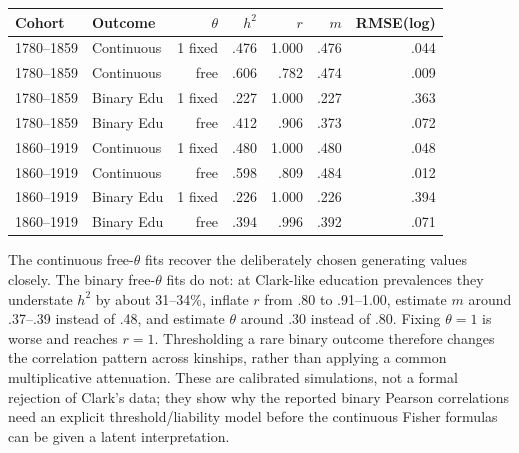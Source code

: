 \begin{center}
\small
\begin{tabular}{llrrrrr}
\hline
Cohort & Outcome & $\theta$ & $h^2$ & $r$ & $m$ & RMSE(log)\\
\hline
1780--1859 & Continuous & 1 fixed & .476 & 1.000 & .476 & .044\\
1780--1859 & Continuous & free & .606 & .782 & .474 & .009\\
1780--1859 & Binary Edu & 1 fixed & .227 & 1.000 & .227 & .363\\
1780--1859 & Binary Edu & free & .412 & .906 & .373 & .072\\
1860--1919 & Continuous & 1 fixed & .480 & 1.000 & .480 & .048\\
1860--1919 & Continuous & free & .598 & .809 & .484 & .012\\
1860--1919 & Binary Edu & 1 fixed & .226 & 1.000 & .226 & .394\\
1860--1919 & Binary Edu & free & .394 & .996 & .392 & .071\\
\hline
\end{tabular}
\end{center}

The continuous free-$\theta$ fits recover the deliberately chosen generating
values closely. The binary free-$\theta$ fits do not: at Clark-like education
prevalences they understate $h^2$ by about 31--34\%, inflate $r$ from .80 to
.91--1.00, estimate $m$ around .37--.39 instead of .48, and estimate
$\theta$ around .30 instead of .80. Fixing $\theta=1$ is worse and reaches
$r=1$. Thresholding a rare binary outcome therefore changes the correlation
pattern across kinships, rather than applying a common multiplicative
attenuation. These are calibrated simulations, not a formal rejection of
Clark's data; they show why the reported binary Pearson correlations need an
explicit threshold/liability model before the continuous Fisher formulas can
be given a latent interpretation.
